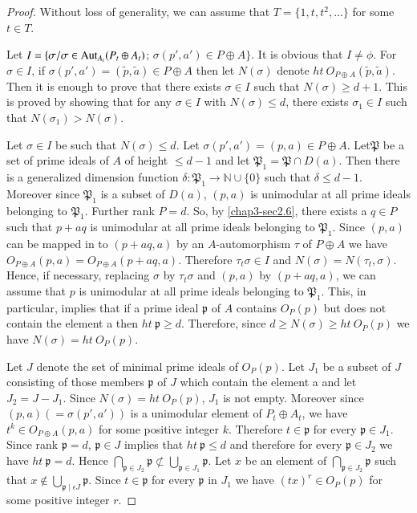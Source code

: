 \begin{proof}
Without loss of generality, we can assume that
$T=\{1,t,t^{2},\ldots\}$ for some $t\in T$.


Let $I=\{\sigma/\sigma \in \operatorname{Aut}_{A_{t}}(P_{t}\oplus A_{t})$;
$\sigma(p',a')\in P\oplus A\}$. It is obvious that $I\neq \phi$. For
$\sigma\in I$, if $\sigma(p',a')=(\widetilde{p},\widetilde{a})\in
P\oplus A$ then let $N(\sigma)$ denote $ht\ O_{P\oplus
A}(\widetilde{p},\widetilde{a})$. Then it is enough to prove that
there exists $\sigma\in I$ such that $N(\sigma)\geq d+1$. This is
proved by showing that for any $\sigma\in I$ with $N(\sigma)\leq d$,
there exists $\sigma_{1}\in I$ such that $N(\sigma_{1})>N(\sigma)$. 

Let $\sigma\in I$ be such that $N(\sigma)\leq d$. Let
$\sigma(p',a')=(p,a)\in P\oplus A$. Let\pageoriginale $\mathfrak{P}$
be a set of prime ideals of $A$ of height $\leq d-1$ and let
$\mathfrak{P}_{1}=\mathfrak{P}\cap D(a)$. Then there is a generalized
dimension function $\delta:\mathfrak{P}_{1}\to \mathbb{N}\cup \{0\}$
such that $\delta\leq d-1$. Moreover since $\mathfrak{P}_{1}$ is a
subset of $D(a)$, $(p,a)$ is unimodular at all prime ideals belonging
to $\mathfrak{P}_{1}$. Further rank $P=d$. So,
by \eqref{chap3-sec2.6}, there exists a $q\in P$ such that $p+aq$ is
unimodular at all prime ideals belonging to $\mathfrak{P}_{1}$. Since
$(p,a)$ can be mapped in to $(p+aq,a)$ by an $A$-automorphism $\tau$
of $P\oplus A$ we have $O_{P\oplus A}(p,a)=O_{P\oplus
A}(p+aq,a)$. Therefore $\tau_{t}\sigma\in I$ and
$N(\sigma)=N(\tau_{t},\sigma)$. Hence, if necessary, replacing
$\sigma$ by $\tau_{t}\sigma$ and $(p,a)$ by $(p+aq,a)$, we can assume
that $p$ is unimodular at all prime ideals belonging to
$\mathfrak{P}_{1}$. This, in particular, implies that if a prime ideal
$\mathfrak{p}$ of $A$ contains $O_{P}(p)$ but does not contain the
element a then $ht\ \mathfrak{p}\geq d$. Therefore, since $d\geq
N(\sigma)\geq ht\ O_{P}(p)$ we have $N(\sigma)=ht\ O_{P}(p)$. 

Let $J$ denote the set of minimal prime ideals of $O_{P}(p)$. Let
$J_{1}$ be a subset of $J$ consisting of those members $\mathfrak{p}$
of $J$ which contain the element a and let $J_{2}=J-J_{1}$. Since
$N(\sigma)=ht\ O_{P}(p)$, $J_{1}$ is not empty. Moreover since
$(p,a)(=\sigma(p',a'))$ is a unimodular element of $P_{t}\oplus
A_{t}$, we have $t^{k}\in O_{P\oplus A}(p,a)$ for some positive
integer $k$. Therefore $t\in \mathfrak{p}$ for every $\mathfrak{p}\in
J_{1}$. Since rank $\mathfrak{p}=d$, $\mathfrak{p}\in J$ implies that
$ht\ \mathfrak{p}\leq d$ and therefore for every $\mathfrak{p}\in
J_{2}$ we have $ht\ \mathfrak{p}=d$. Hence
$\bigcap\limits_{\mathfrak{p}\in
J_{2}}\mathfrak{p}\nsubset \bigcup\limits_{\mathfrak{p}\in
J_{1}}\mathfrak{p}$. Let $x$ be an element of
$\bigcap\limits_{\mathfrak{p}\in J_{2}}\mathfrak{p}$ such that
$x\not\in \bigcup\limits_{\mathfrak{p}\mid \epsilon
J}\mathfrak{p}$. Since $t\in \mathfrak{p}$ for every $\mathfrak{p}$ in
$J_{1}$ we have $(tx)^{r}\in O_{P}(p)$ for some positive integer $r$. 


\end{proof}
